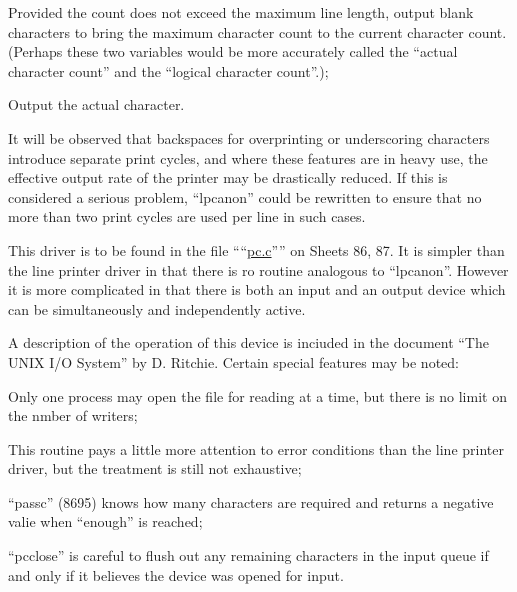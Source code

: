 \item[8954:] Provided the
count does not exceed the maximum
line length, output blank characters to
bring the maximum character count to the
current character count. (Perhaps these two
variables would be more accurately called the
``actual character count'' and the ``logical character count''.);

\item[8959:] Output the actual character.
\ed


It will be observed that backspaces for
overprinting or underscoring characters
introduce separate print cycles, and
where these features are in heavy use,
the effective output rate of the
printer may be drastically reduced. If
this is considered a serious problem,
``lpcanon'' could be rewritten to ensure
that no more than two print cycles are
used per line in such cases.


This driver is to be found in the file
````\href{./v6/dmr/pc.c}{pc.c}'''' on Sheets 86, 87. It is simpler
than the line printer driver in that
there is ro routine analogous to
``lpcanon''. However it is more complicated in that there is both an input
and an output device which can be
simultaneously and independently
active.

A description of the operation of this
device is inciuded in the document ``The
UNIX I/O System'' by D. Ritchie. Certain
special features may be noted:

\bd
\item[(1)] Only one process may open the file
for reading at a time, but there is no
limit on the nmber of writers;

\item[(2)] This routine pays a little more
attention to error conditions than the
line printer driver, but the treatment
is still not exhaustive;

\item[(3)] ``passc'' (8695) knows how many
characters are required and returns a
negative valie when ``enough'' is
reached;

\item[(4)] ``pcclose'' is careful to flush out
any remaining characters in the input
queue if and only if it believes the
device was opened for input.
\ed
